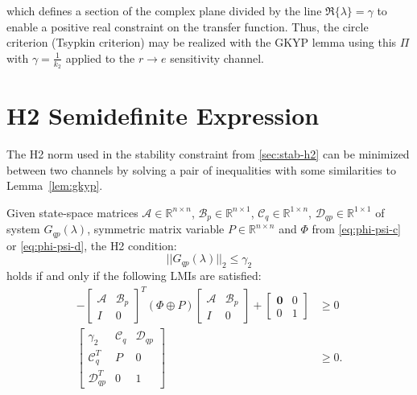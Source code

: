 which defines a section of the complex plane divided by the line $\Re{\{\lambda\}} = \gamma$ to enable a positive real constraint on the transfer function. Thus, the circle criterion (Tsypkin criterion) may be realized with the \gls{GKYP} lemma using this $\Pi$ with $\gamma = \frac{1}{k_2}$ applied to the $r \rightarrow e$ sensitivity channel.

\section{\gls{H2} Semidefinite Expression}
\label{sec:opt-h2}

The \gls{H2} norm used in the stability constraint from \autoref{sec:stab-h2} can be minimized between two channels by solving a pair of inequalities with some similarities to Lemma~\ref{lem:gkyp}.

\begin{thm} \label{thm:h2}
	Given state-space matrices $\mathcal{A} \in \mathbb{R}^{n \times n}$, $\mathcal{B}_p \in \mathbb{R}^{n \times 1}$, $\mathcal{C}_q \in \mathbb{R}^{1 \times n}$, $\mathcal{D}_{qp} \in \mathbb{R}^{1 \times 1}$ of system $G_{qp}(\lambda)$, symmetric matrix variable $P \in \mathbb{R}^{n \times n}$ and $\Phi$ from \autoref{eq:phi-psi-c} or \ref{eq:phi-psi-d}, the \gls{H2} condition:
	\begin{equation*}
		||G_{qp}(\lambda)||_2 \leq \gamma_2
	\end{equation*}
	holds if and only if the following \gls{LMI}s are satisfied:
	\begin{align}
		-\begin{bmatrix}
			\mathcal{A} & \mathcal{B}_p \\
			I & 0
		\end{bmatrix}^T
		\left(\Phi \oplus P\right)
		\begin{bmatrix}
			\mathcal{A} & \mathcal{B}_p \\
			I & 0
		\end{bmatrix} +
		\begin{bmatrix}
			\mathbf{0} & 0 \\
			0 & 1
		\end{bmatrix}
		&\geq 0 \label{eq:lmi2-1} \\
		\begin{bmatrix}
			\gamma_2 & \mathcal{C}_q & \mathcal{D}_{qp} \\
			\mathcal{C}_q^T & P & 0 \\
			\mathcal{D}_{qp}^T & 0 & 1
		\end{bmatrix}
		&\geq 0 \label{eq:lmi2-2}.
	\end{align}
\end{thm}

